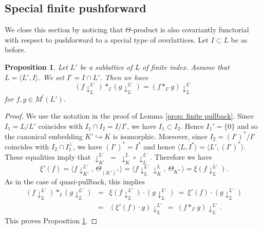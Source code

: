 \documentclass[12pt]{amsart}
\numberwithin{equation}{section}
\newtheorem{proposition}[theorem]{Proposition}
\theoremstyle{definition}
\theoremstyle{remark}
\begin{document}
  


\subsection{Special finite pushforward}\label{ssec: functorial push}

We close this section by noticing that 
$\Theta$-product is also covariantly functorial with respect to 
pushforward to a special type of overlattices. 
Let $I\subset L$ be as before. 

\begin{proposition}\label{prop: functorial push}
Let $L'$ be a sublattice of $L$ of finite index. 
Assume that $L= \langle L', I \rangle$. 
We set $I'=I\cap L'$. 
Then we have 
\begin{equation*}
(f\! \downarrow^{L'}_{L})\ast_{I}(g\! \downarrow^{L'}_{L}) = 
(f\ast_{I'}g)\! \downarrow^{L'}_{L} 
\end{equation*}
for $f, g\in M^!(L')$. 
\end{proposition}

\begin{proof}
We use the notation in the proof of Lemma \ref{prop: finite pullback}. 
Since $I_1=L/L'$ coincides with $I_1\cap I_2=I/I'$, 
we have $I_1 \subset I_2$. 
Hence $I_{1}'=\{ 0 \}$ 
and so the canonical embedding $K'\hookrightarrow K$ is isomorphic. 
Moreover, since $I_{2}=(I')^{\ast}/I'$ coincides with $I_{2}\cap I_{1}^{\perp}$, 
we have $(I')^{\ast}=I^{\ast}$ and hence 
$\langle L, I^{\ast} \rangle = \langle L', (I')^{\ast} \rangle$. 
These equalities imply that 
$\downarrow^{L'}_{K'} \: = \: \downarrow^{L}_{K} \circ \downarrow^{L'}_{L}$. 
Therefore we have 
\begin{equation*}
\xi'(f) = 
\langle f\! \downarrow^{L'}_{K'}, \: \Theta_{(K')^{+}} \rangle = 
\langle f\! \downarrow^{L'}_{L} \downarrow^{L}_{K}, \: \Theta_{K^{+}} \rangle = 
\xi(f\! \downarrow^{L'}_{L}). 
\end{equation*}
As in the case of quasi-pullback, 
this implies 
\begin{eqnarray*}
(f\! \downarrow^{L'}_{L})\ast_{I}(g\! \downarrow^{L'}_{L}) 
& = & 
\xi(f\! \downarrow^{L'}_{L})\cdot (g\! \downarrow^{L'}_{L}) 
\: = \: \xi'(f)\cdot (g\! \downarrow^{L'}_{L}) \\ 
& = & 
(\xi'(f)\cdot g)\! \downarrow^{L'}_{L} 
\: = \: (f\ast_{I'}g)\! \downarrow^{L'}_{L}. 
\end{eqnarray*}
This proves Proposition \ref{prop: functorial push}. 
\end{proof}
\end{document}
